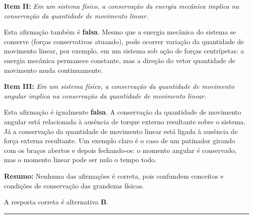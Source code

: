 \documentclass[a4paper,12pt]{article}
\begin{document}
\begin{flushleft}
\vspace{0.3cm}

\textbf{Item II:} \textit{Em um sistema físico, a conservação da energia mecânica implica na conservação da quantidade de movimento linear.}

Esta afirmação também é \textbf{falsa}.  
Mesmo que a energia mecânica do sistema se conserve (forças conservativas atuando), pode ocorrer variação da quantidade de movimento linear, por exemplo, em um sistema sob ação de forças centrípetas: a energia mecânica permanece constante, mas a direção do vetor quantidade de movimento muda continuamente.

\vspace{0.3cm}

\textbf{Item III:} \textit{Em um sistema físico, a conservação da quantidade de movimento angular implica na conservação da quantidade de movimento linear.}

Esta afirmação é igualmente \textbf{falsa}.  
A conservação da quantidade de movimento angular está relacionada à ausência de torque externo resultante sobre o sistema.  
Já a conservação da quantidade de movimento linear está ligada à ausência de força externa resultante.  
Um exemplo claro é o caso de um patinador girando com os braços abertos e depois fechando-os: o momento angular é conservado, mas o momento linear pode ser nulo o tempo todo.

\vspace{0.3cm}

\textbf{Resumo:}  
Nenhuma das afirmações é correta, pois confundem conceitos e condições de conservação das grandezas físicas.

\vspace{0.3cm}

A resposta correta é alternativa \colorbox{green!50}{\textbf{B}}.

\end{flushleft}

\noindent\rule{\linewidth}{0.6pt}\\
\end{document}
